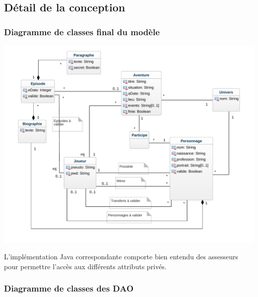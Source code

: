 \documentclass[a4paper, 11pt, titlepage]{article}
\begin{document}
\subsection {Détail de la conception}

\subsubsection {Diagramme de classes final du modèle}

\begin{center}
\includegraphics[scale=0.7]{conception/classes.pdf}
\end{center}

L'implémentation Java correspondante comporte bien entendu des assesseurs pour permettre l'accès aux différents attributs privés.


\subsubsection {Diagramme de classes des DAO}
\end{document}
